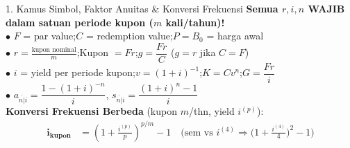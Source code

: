 \documentclass[10pt,a4paper,twocolumn]{article}
\newcommand{\angl}[1]{\overline{#1|}}
\begin{document}
\footnotesize


\begin{cbox}{1. Kamus Simbol, Faktor Anuitas \& Konversi Frekuensi}
\textbf{Semua $r, i, n$ WAJIB dalam satuan periode kupon ($m$ kali/tahun)!}\\[0.8pt]
$\bullet$ $F$ = par value;\quad $C$ = redemption value;\quad $P = B_0$ = harga awal\\
$\bullet$ $r = \frac{\text{kupon nominal}}{m}$;\quad Kupon $= Fr$;\quad $g = \dfrac{Fr}{C}$ ($g = r$ jika $C = F$)\\
$\bullet$ $i$ = yield per periode kupon;\quad $v = (1+i)^{-1}$;\quad $K = Cv^n$;\quad $G = \dfrac{Fr}{i}$\\
$\bullet$ $a_{\angl{n}i} = \dfrac{1 - (1+i)^{-n}}{i}$, \qquad $s_{\angl{n}i} = \dfrac{(1+i)^n - 1}{i}$\\[1.5pt]
\textbf{Konversi Frekuensi Berbeda} (kupon $m$/thn, yield $i^{(p)}$):
\begin{align*}
    \mathbf{i_{\text{kupon}}} &= \left(1 + \frac{i^{(p)}}{p}\right)^{p/m} - 1 \quad\Big(\text{sem vs } i^{(4)} \Rightarrow \big(1+\tfrac{i^{(4)}}{4}\big)^2 - 1\Big)
\end{align*}
\end{cbox}
\end{document}
